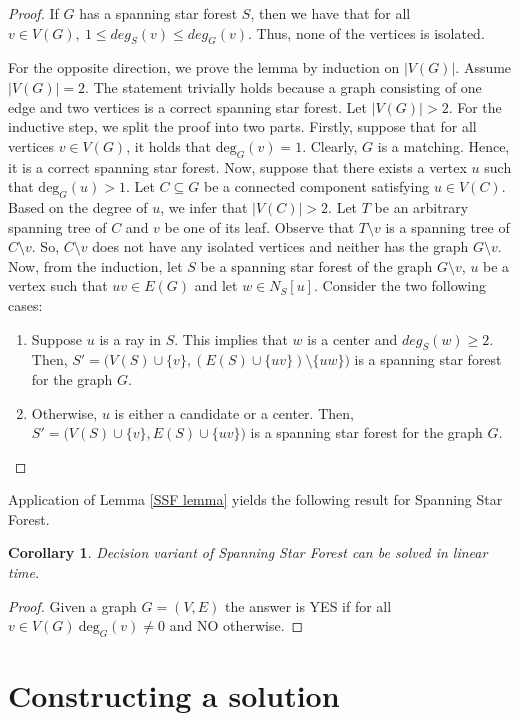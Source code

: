 \documentclass[en]{pracamgr}
\newtheorem{corollary}{Corollary}
\theoremstyle{definition}
\newcommand{\ssf}{spanning star forest}
\newcommand{\ssfp}{{\sc Spanning Star Forest}}
\newcommand{\degree}[2]{\textrm{deg}_{#1}(#2)}
\begin{document}
\begin{proof}
	If $G$ has a \ssf{} $S$, then we have that for all $v \in V(G),\ 1 \leq deg_S(v) \leq deg_G(v)$. Thus, none of the vertices is isolated.
	
	For the opposite direction, we prove the lemma by induction on $|V(G)|$. Assume $|V(G)|=2$. The statement trivially holds because a graph consisting of one edge and two vertices is a correct \ssf{}. Let $|V(G)| >2$. For the inductive step, we split the proof into two parts. Firstly, suppose that for all vertices $v \in V(G)$, it holds that $\degree{G}{v}=1$.  Clearly, $G$ is a matching. Hence, it is a correct \ssf{}. Now, suppose that there exists a vertex $u$ such that $\degree{G}{u}>1$. Let $C \subseteq G$ be a connected component satisfying $u \in V(C)$. Based on the degree of $u$, we infer that $|V(C)|>2$. Let $T$ be an arbitrary spanning tree of $C$ and $v$ be one of its leaf. Observe that $T \setminus v$ is a spanning tree of $C \setminus v$. So, $C \setminus v$ does not have any isolated vertices and neither has the graph $G \setminus v$. Now, from the induction, let $S$ be a \ssf{} of the graph $G \setminus v$, $u$ be a vertex such that $uv \in E(G)$ and let $w \in N_S[u]$. Consider the two following cases:
	\begin{enumerate}
		\item Suppose $u$ is a ray in $S$. This implies that $w$ is a center and $deg_S(w) \geq 2$. Then, $S'=\big(V(S) \cup \{v\},(E(S) \cup \{uv\}) \setminus \{uw\}\big)$ is a spanning star forest for the graph $G$.
		\item Otherwise, $u$ is either a candidate or a center. Then, $S'=\big(V(S) \cup \{v\}, E(S) \cup \{uv\}\big)$ is a spanning star forest for the graph $G$.
	\end{enumerate}
	
\end{proof}

Application of Lemma \ref{SSF lemma} yields the following result for \ssfp{}.

\begin{corollary}
	Decision variant of \ssfp{} can be solved in linear time.
\end{corollary}

\begin{proof}
	Given a graph $G = (V,E)$ the answer is YES if for all $v \in V(G)\ \degree{G}{v} \neq 0$ and NO otherwise.
\end{proof}

\section{Constructing a solution}
\end{document}
